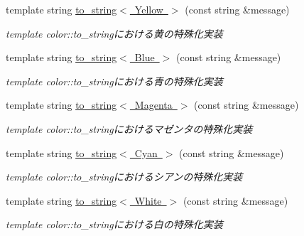 \begin{DoxyCompactItemize}
\mbox{\label{namespace_g_a_1_1color_aff5ba9dcdd27d18076ee85ffe9606efc}} 
template string \mbox{\hyperlink{namespace_g_a_1_1color_aff5ba9dcdd27d18076ee85ffe9606efc}{to\+\_\+string$<$ Yellow $>$}} (const string \&message)
\begin{DoxyCompactList}\small\item\em template color\+::to\+\_\+stringにおける黄の特殊化実装 \end{DoxyCompactList}\item 
\mbox{\label{namespace_g_a_1_1color_acdf422ae440ac8bc34437328a1cfb519}} 
template string \mbox{\hyperlink{namespace_g_a_1_1color_acdf422ae440ac8bc34437328a1cfb519}{to\+\_\+string$<$ Blue $>$}} (const string \&message)
\begin{DoxyCompactList}\small\item\em template color\+::to\+\_\+stringにおける青の特殊化実装 \end{DoxyCompactList}\item 
\mbox{\label{namespace_g_a_1_1color_ae1b271066be4c4b784f12e09159dc895}} 
template string \mbox{\hyperlink{namespace_g_a_1_1color_ae1b271066be4c4b784f12e09159dc895}{to\+\_\+string$<$ Magenta $>$}} (const string \&message)
\begin{DoxyCompactList}\small\item\em template color\+::to\+\_\+stringにおけるマゼンタの特殊化実装 \end{DoxyCompactList}\item 
\mbox{\label{namespace_g_a_1_1color_a52355e6276e8691964a5a070606b001f}} 
template string \mbox{\hyperlink{namespace_g_a_1_1color_a52355e6276e8691964a5a070606b001f}{to\+\_\+string$<$ Cyan $>$}} (const string \&message)
\begin{DoxyCompactList}\small\item\em template color\+::to\+\_\+stringにおけるシアンの特殊化実装 \end{DoxyCompactList}\item 
\mbox{\label{namespace_g_a_1_1color_ac9189839a1cb7e83eef2bb25be7b05f6}} 
template string \mbox{\hyperlink{namespace_g_a_1_1color_ac9189839a1cb7e83eef2bb25be7b05f6}{to\+\_\+string$<$ White $>$}} (const string \&message)
\begin{DoxyCompactList}\small\item\em template color\+::to\+\_\+stringにおける白の特殊化実装 \end{DoxyCompactList}\item 

\end{DoxyCompactItemize}

